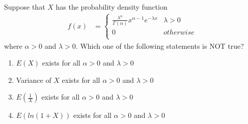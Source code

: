 \documentclass[journal,12pt,twocolumn]{IEEEtran}
\theoremstyle{remark}
\begin{document}



\maketitle

\newpage


\bigskip

\renewcommand{\thefigure}{\theenumi}
\renewcommand{\thetable}{\theenumi}

Suppose that $X$ has the probability density function
\begin{align}
f(x)&=
\begin{cases}
\frac{\lambda^{\alpha}}{\Gamma(\alpha)}x^{\alpha - 1} e^{-\lambda x} & \lambda > 0\\
0 & otherwise\\
\end{cases}
\end{align}
where $\alpha > 0$ and $\lambda > 0$. Which one of the following statements is NOT true?
\begin{enumerate}
\item $E(X)$ exists for all $\alpha > 0 $ and $ \lambda > 0$
\item Variance of $X$ exists for all $\alpha > 0$ and $\lambda > 0$
\item $E(\frac{1}{X})$ exists for all $\alpha > 0$ and $\lambda > 0$
\item $E(ln(1+X))$ exists for all $\alpha > 0$ and $\lambda > 0$
\end{enumerate}
\fi
\solution
\end{document}
